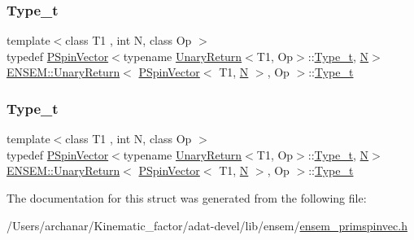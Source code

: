\subsubsection{\texorpdfstring{Type\_t}{Type\_t}\hspace{0.1cm}{\footnotesize\ttfamily [2/3]}}
{\footnotesize\ttfamily template$<$class T1 , int N, class Op $>$ \\
typedef \mbox{\hyperlink{classENSEM_1_1PSpinVector}{P\+Spin\+Vector}}$<$typename \mbox{\hyperlink{structENSEM_1_1UnaryReturn}{Unary\+Return}}$<$T1, Op$>$\+::\mbox{\hyperlink{structENSEM_1_1UnaryReturn_3_01PSpinVector_3_01T1_00_01N_01_4_00_01Op_01_4_aa89ab5c0224d9343b5849e81a52271d4}{Type\+\_\+t}}, \mbox{\hyperlink{adat__devel_2lib_2hadron_2operator__name__util_8cc_a7722c8ecbb62d99aee7ce68b1752f337}{N}}$>$ \mbox{\hyperlink{structENSEM_1_1UnaryReturn}{E\+N\+S\+E\+M\+::\+Unary\+Return}}$<$ \mbox{\hyperlink{classENSEM_1_1PSpinVector}{P\+Spin\+Vector}}$<$ T1, \mbox{\hyperlink{adat__devel_2lib_2hadron_2operator__name__util_8cc_a7722c8ecbb62d99aee7ce68b1752f337}{N}} $>$, Op $>$\+::\mbox{\hyperlink{structENSEM_1_1UnaryReturn_3_01PSpinVector_3_01T1_00_01N_01_4_00_01Op_01_4_aa89ab5c0224d9343b5849e81a52271d4}{Type\+\_\+t}}}

\mbox{\label{structENSEM_1_1UnaryReturn_3_01PSpinVector_3_01T1_00_01N_01_4_00_01Op_01_4_aa89ab5c0224d9343b5849e81a52271d4}} 
\subsubsection{\texorpdfstring{Type\_t}{Type\_t}\hspace{0.1cm}{\footnotesize\ttfamily [3/3]}}
{\footnotesize\ttfamily template$<$class T1 , int N, class Op $>$ \\
typedef \mbox{\hyperlink{classENSEM_1_1PSpinVector}{P\+Spin\+Vector}}$<$typename \mbox{\hyperlink{structENSEM_1_1UnaryReturn}{Unary\+Return}}$<$T1, Op$>$\+::\mbox{\hyperlink{structENSEM_1_1UnaryReturn_3_01PSpinVector_3_01T1_00_01N_01_4_00_01Op_01_4_aa89ab5c0224d9343b5849e81a52271d4}{Type\+\_\+t}}, \mbox{\hyperlink{adat__devel_2lib_2hadron_2operator__name__util_8cc_a7722c8ecbb62d99aee7ce68b1752f337}{N}}$>$ \mbox{\hyperlink{structENSEM_1_1UnaryReturn}{E\+N\+S\+E\+M\+::\+Unary\+Return}}$<$ \mbox{\hyperlink{classENSEM_1_1PSpinVector}{P\+Spin\+Vector}}$<$ T1, \mbox{\hyperlink{adat__devel_2lib_2hadron_2operator__name__util_8cc_a7722c8ecbb62d99aee7ce68b1752f337}{N}} $>$, Op $>$\+::\mbox{\hyperlink{structENSEM_1_1UnaryReturn_3_01PSpinVector_3_01T1_00_01N_01_4_00_01Op_01_4_aa89ab5c0224d9343b5849e81a52271d4}{Type\+\_\+t}}}



The documentation for this struct was generated from the following file\+:\begin{DoxyCompactItemize}
\item 
/\+Users/archanar/\+Kinematic\+\_\+factor/adat-\/devel/lib/ensem/\mbox{\hyperlink{adat-devel_2lib_2ensem_2ensem__primspinvec_8h}{ensem\+\_\+primspinvec.\+h}}\end{DoxyCompactItemize}
